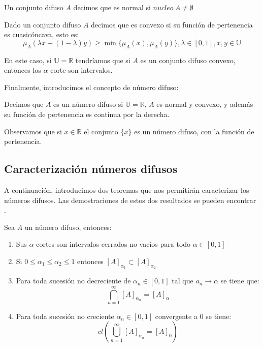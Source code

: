 \begin{definicion}
	\label{def:difuso_normal}
	Un conjunto difuso $A$ decimos que es normal si $nucleo ~ A \neq \emptyset$
\end{definicion}

\begin{definicion}
	\label{def:difuso_convexo}
	Dado un conjunto difuso $A$ decimos que es convexo si su función de pertenencia es cuasicóncava, esto es:
	\[
		\mu_A(\lambda x + (1-\lambda)y) \geq \min{\{\mu_A(x), \mu_A(y)\}}, \lambda \in [0, 1], x, y \in \mathbb{U}
	\]
\end{definicion}

En este caso, si $\mathbb{U}=\mathbb{R}$ tendríamos que si $A$ es un conjunto difuso convexo, entonces los $\alpha$-corte son intervalos.

Finalmente, introducimos el concepto de número difuso:

\begin{definicion}
	\label{def:numero_difuso}
	Decimos que $A$ es un número difuso si $\mathbb{U}=\mathbb{R}$, $A$ es normal y convexo, y además su función de pertenencia es continua por la derecha.
\end{definicion}


Observamos que si $x \in \mathbb{R}$ el conjunto $\{x\}$ es un número difuso, con la función de pertenencia.


\subsection{Caracterización números difusos}
A continuación, introducimos dos teoremas que nos permitirán caracterizar los números difusos. Las demostraciones de estos dos resultados se pueden encontrar \cite{apuntesfuzzy}.

\begin{teorema}
	Sea $A$ un número difuso, entonces:
	\begin{enumerate}
		\item Sus $\alpha$-cortes son intervalos cerrados no vacíos para todo $\alpha \in [0, 1]$
		\item Si $0 \leq \alpha_1 \leq \alpha_2 \leq 1$ entonces $[A]_{\alpha_1} \subset [A]_{\alpha_2}$
		\item Para toda sucesión no decreciente de $\alpha_n \in [0, 1]$ tal que $a_n \longrightarrow \alpha$ se tiene que:
		\[
			\bigcap^\infty_{n=1} [A]_{\alpha_n} = [A]_\alpha
		\]
		\item Para toda sucesión no creciente $\alpha_n \in [0, 1]$ convergente a $0$ se tiene:
		\[
			cl\left(
				\bigcup^\infty_{n=1} [A]_{\alpha_n} = [A]_0
			\right)
		\]
	\end{enumerate}
\end{teorema}

